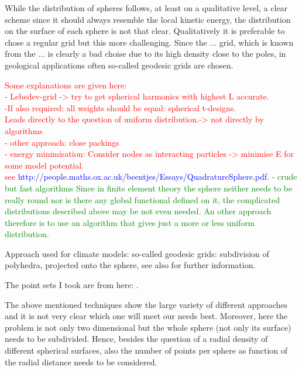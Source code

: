 While the distribution of spheres follows, at least on a qualitative level, a clear scheme since it should always resemble the local kinetic energy, the distribution on the surface of each sphere is not that clear.
Qualitatively it is preferable to chose a regular grid but this more challenging.
Since the ... grid, which is known from the ... is clearly a bad choise due to its high density close to the poles, in geological applications often so-called geodesic grids are chosen.

\textcolor{red}{
Some explanations are given here:\\ %
- Lebedev-grid -> try to get spherical harmonics with highest L accurate.\\
-If also required: all weights should be equal: spherical t-designs. \\
Leads directly to the question of uniform distribution.-> not directly by algorithms\\
- other approach: close packings \\
- energy minimisation: Consider nodes as interacting particles -> minimise E for some model potential.\\
see} \textcolor{blue}{http://people.maths.ox.ac.uk/beentjes/Essays/QuadratureSphere.pdf}.
\textcolor{green}{
- crude but fast algorithms
Since in finite element theory the sphere neither needs to be really round nor is there any global functional defined on it,
the complicated distributions described above may be not even needed. 
An other approach therefore is to use an algorithm that gives just a more or less uniform distribution.}

Approach used for climate models: so-called geodesic grids: subdivision of polyhedra, projected onto the sphere\cite{geodesic1, geodesic2}, see also
for further information.

The point sets I took are from here: %
\cite{womersley,fliegeMaier}.

The above mentioned techniques show the large variety of different approaches and it is not very clear which one will meet our needs best.
Moreover, here the problem is not only two dimensional but the whole sphere (not only its surface) needs to be subdivided. 
Hence, besides the question of a radial density of different spherical surfaces, also the number of points per sphere as function of the radial distance 
needs to be considered.

